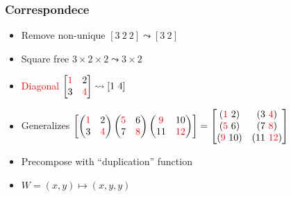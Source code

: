 \documentclass[xetex,mathserif,serif]{beamer}
\newcommand\NB[1]{\textcolor{red}{#1}}
\begin{document}
\begin{frame}
  \frametitle{Correspondece}
  \begin{itemize}[<+->]
    \item Remove non-unique $[3\ 2\ 2] \leadsto [3\ 2]$
    \item Square free $3\times 2\times 2\leadsto 3 \times 2$
    \item \NB{Diagonal} $
      \begin{bmatrix}
        \NB 1 & 2 \\
        3 & \NB 4
      \end{bmatrix} \leadsto [1\ 4]
      $
    \item Generalizes $
      \begin{bmatrix}
        \begin{pmatrix}
          \NB 1 & 2 \\ 3 &\NB  4
        \end{pmatrix}
        \begin{pmatrix}
          \NB 5 & 6 \\ 7 & \NB 8
        \end{pmatrix}
        \begin{pmatrix}
          \NB 9 & 10 \\ 11 & \NB{12}
        \end{pmatrix}
      \end{bmatrix} = 
      \begin{bmatrix}
        (\NB 1\ 2) & (3\ \NB 4) \\
        (\NB 5\ 6) & (7\ \NB 8) \\
        (\NB 9\ 10) & (11\ \NB{12})
      \end{bmatrix}  
      $
    \item Precompose with ``duplication'' function
    \item $W = (x, y) \mapsto (x, y, y)$
  \end{itemize}
\end{frame}
\end{document}
